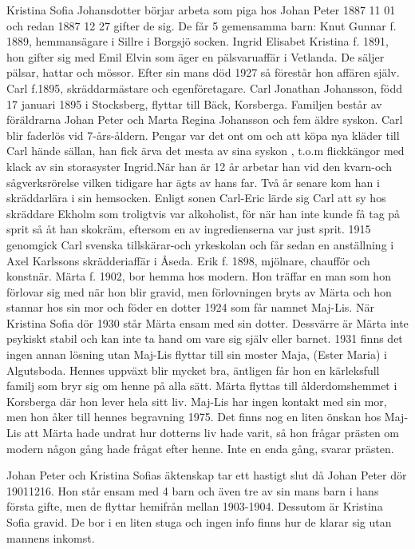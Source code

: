 Kristina Sofia Johansdotter börjar arbeta som piga hos Johan Peter 1887 11 01 och redan 1887 12 27 gifter de sig. De får 5 gemensamma barn:
Knut Gunnar f. 1889, hemmansägare i Sillre i Borgsjö socken. Ingrid Elisabet Kristina f. 1891, hon gifter sig med Emil Elvin som äger en pälsvaruaffär i Vetlanda. De säljer pälsar, hattar och mössor. Efter sin mans död 1927 så förestår hon affären själv. Carl f.1895, skräddarmästare och egenföretagare.
Carl Jonathan Johansson, född 17 januari 1895 i Stocksberg, flyttar till Bäck, Korsberga. Familjen består av föräldrarna Johan Peter och Marta Regina Johansson och fem äldre syskon. Carl blir faderlös vid 7-års-åldern. Pengar var det ont om och att köpa nya kläder till Carl hände sällan, han fick ärva det mesta av sina syskon , t.o.m flickkängor med klack av sin storasyster Ingrid.När han är 12 år arbetar han vid den kvarn-och sågverksrörelse vilken tidigare har ägts av hans far. Två år senare kom han i skräddarlära i sin hemsocken. Enligt sonen Carl-Eric lärde sig Carl att sy hos skräddare Ekholm som troligtvis var alkoholist, för när han inte kunde få tag på sprit så åt han skokräm, eftersom en av ingredienserna var just sprit. 1915 genomgick Carl svenska tillskärar-och yrkeskolan och får sedan en anställning i Axel Karlssons skrädderiaffär i Åseda.
 Erik f. 1898, mjölnare, chaufför och konstnär. Märta f. 1902, bor hemma hos modern. Hon träffar en man som hon förlovar sig med när hon blir gravid, men förlovningen bryts av Märta och hon stannar hos sin mor och föder en dotter 1924 som får namnet Maj-Lis. När Kristina Sofia dör 1930 står Märta ensam med sin dotter. Dessvärre är Märta inte psykiskt stabil och kan inte ta hand om vare sig själv eller barnet. 1931 finns det ingen annan lösning utan Maj-Lis flyttar till sin moster Maja, (Ester Maria) i Algutsboda. Hennes uppväxt blir mycket bra, äntligen får hon en kärleksfull familj som bryr sig om henne på alla sätt.
Märta flyttas till ålderdomshemmet i Korsberga där hon lever hela sitt liv.
Maj-Lis har ingen kontakt med sin mor, men hon åker till hennes begravning 1975. Det finns nog en liten önskan hos Maj-Lis att Märta hade undrat hur dotterns liv hade varit, så hon frågar prästen om modern någon gång hade frågat efter henne. Inte en enda gång, svarar prästen.


Johan Peter och Kristina Sofias äktenskap tar ett hastigt slut då Johan Peter dör 19011216.
Hon står ensam med 4 barn och även tre av sin mans barn i hans första gifte, men de flyttar hemifrån mellan 1903-1904.  Dessutom är Kristina Sofia gravid. De bor i en liten stuga och ingen info finns hur de klarar sig utan mannens inkomst. 


